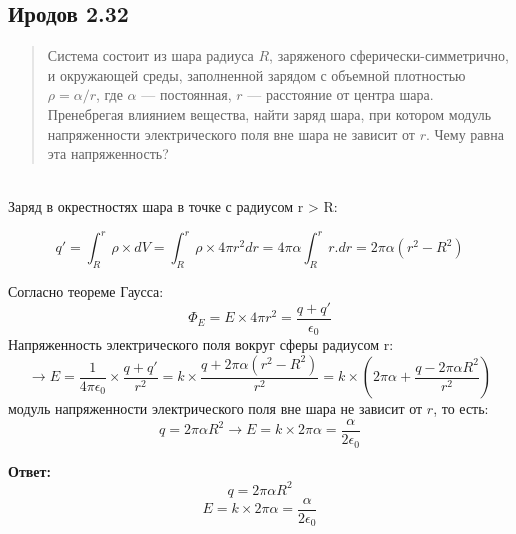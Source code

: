 \subsection*{Иродов 2.32}

\setcounter{equation}{0}

\begin{abstract}
Система состоит из шара радиуса $R$, заряженого сферически-симметрично, и окружающей среды, заполненной зарядом с
объемной плотностью $\rho = \alpha/r$, где $\alpha$ — постоянная, $r$ — расстояние от центра шара. Пренебрегая влиянием вещества, найти заряд шара, при котором модуль напряженности электрического
поля вне шара не зависит от $r$. Чему равна эта напряженность?
\end{abstract}

\noindent \hrulefill
\\
Заряд в окрестностях шара в точке с радиусом r > R:  

$$q'= \displaystyle \int_{R}^{r} \rho \times dV = \displaystyle \int_{R}^{r} \rho \times 4 \pi r^2 dr = 4 \pi \alpha\displaystyle \int_{R}^{r} r .dr = 2 \pi \alpha (r^2 - R^2)  $$

Согласно теореме Гаусса: 
$$\Phi_E = E \times 4 \pi r^2 = \frac{q + q'}{\epsilon_0}$$
Напряженность электрического поля вокруг сферы радиусом r: 
$$ \xrightarrow{} E = \frac{1}{4 \pi \epsilon_0} \times \frac{q + q'}{r^2} = k \times \frac{q + 2 \pi \alpha(r^2 - R^2)}{r^2} = k \times (2 \pi \alpha + \frac{q - 2 \pi \alpha R^2}{r^2})$$
модуль напряженности электрического
поля вне шара не зависит от $r$,  то есть:
$$ q = 2 \pi \alpha R^2 \xrightarrow[]{} E = k \times 2 \pi \alpha = \frac{\alpha}{2 \epsilon_0}$$



\textbf{Ответ:}
$$ q = 2 \pi \alpha R^2 $$
$$E = k \times 2 \pi \alpha = \frac{\alpha}{2 \epsilon_0}$$


